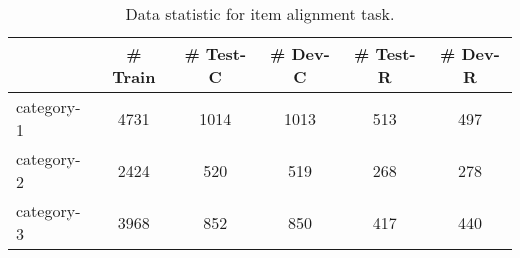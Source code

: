 
\begin{table}[!hbpt]
    \centering
    \caption{Data statistic for item alignment task.}
    \begin{tabular}{l |c | c | c | c | c}
    \toprule
          & \# Train & \# Test-C & \# Dev-C & \# Test-R & \# Dev-R\\
        \midrule
        category-1 & 4731 & 1014 & 1013 & 513 & 497\\
        category-2 & 2424 & 520 & 519 & 268 & 278 \\
        category-3 & 3968 & 852 & 850 & 417 & 440\\
        \bottomrule
    \end{tabular}
    \label{tab:data-same-item}
\end{table}
